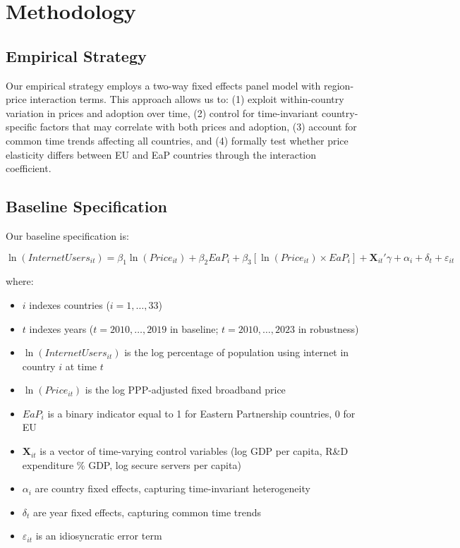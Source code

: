 \documentclass[12pt,review]{elsarticle}
\begin{document}
\section{Methodology}
\label{sec:methodology}

\subsection{Empirical Strategy}

Our empirical strategy employs a two-way fixed effects panel model with region-price interaction terms. This approach allows us to: (1) exploit within-country variation in prices and adoption over time, (2) control for time-invariant country-specific factors that may correlate with both prices and adoption, (3) account for common time trends affecting all countries, and (4) formally test whether price elasticity differs between EU and EaP countries through the interaction coefficient.

\subsection{Baseline Specification}

Our baseline specification is:

\begin{equation}
\label{eq:main}
\ln(InternetUsers_{it}) = \beta_1 \ln(Price_{it}) + \beta_2 EaP_i + \beta_3 [\ln(Price_{it}) \times EaP_i] + \mathbf{X}_{it}'\gamma + \alpha_i + \delta_t + \varepsilon_{it}
\end{equation}

where:
\begin{itemize}
\item $i$ indexes countries ($i = 1, \ldots, 33$)
\item $t$ indexes years ($t = 2010, \ldots, 2019$ in baseline; $t = 2010, \ldots, 2023$ in robustness)
\item $\ln(InternetUsers_{it})$ is the log percentage of population using internet in country $i$ at time $t$
\item $\ln(Price_{it})$ is the log PPP-adjusted fixed broadband price
\item $EaP_i$ is a binary indicator equal to 1 for Eastern Partnership countries, 0 for EU
\item $\mathbf{X}_{it}$ is a vector of time-varying control variables (log GDP per capita, R\&D expenditure \% GDP, log secure servers per capita)
\item $\alpha_i$ are country fixed effects, capturing time-invariant heterogeneity
\item $\delta_t$ are year fixed effects, capturing common time trends
\item $\varepsilon_{it}$ is an idiosyncratic error term
\end{itemize}
\end{document}

